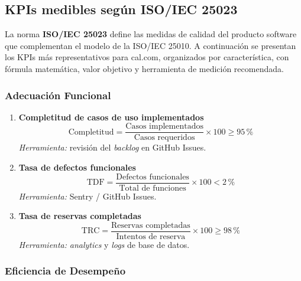 \documentclass[12pt, a4paper]{article}
\begin{document}
\subsection{KPIs medibles según ISO/IEC 25023}

La norma \textbf{ISO/IEC 25023} \parencite{iso25023} define las medidas de calidad del producto software que
complementan el modelo de la ISO/IEC 25010. A continuación se presentan los KPIs más
representativos para cal.com, organizados por característica, con fórmula matemática,
valor objetivo y herramienta de medición recomendada.

\subsubsection*{Adecuación Funcional}

\begin{enumerate}[leftmargin=*, label=\textbf{KPI \arabic*.}]

    \item \textbf{Completitud de casos de uso implementados}
    \[
        \text{Completitud} = \frac{\text{Casos implementados}}{\text{Casos requeridos}} \times 100 \geq 95\,\%
    \]
    \textit{Herramienta:} revisión del \textit{backlog} en GitHub Issues.

    \item \textbf{Tasa de defectos funcionales}
    \[
        \text{TDF} = \frac{\text{Defectos funcionales}}{\text{Total de funciones}} \times 100 < 2\,\%
    \]
    \textit{Herramienta:} Sentry / GitHub Issues.

    \item \textbf{Tasa de reservas completadas}
    \[
        \text{TRC} = \frac{\text{Reservas completadas}}{\text{Intentos de reserva}} \times 100 \geq 98\,\%
    \]
    \textit{Herramienta:} \textit{analytics} y \textit{logs} de base de datos.

\end{enumerate}

\subsubsection*{Eficiencia de Desempeño}
\end{document}
